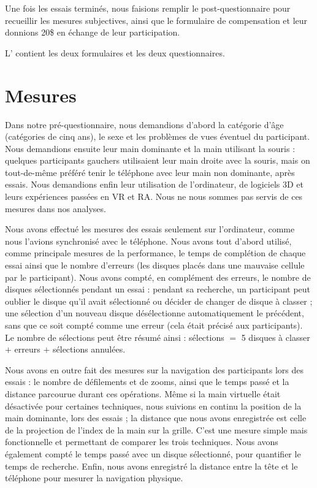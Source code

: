 Une fois les essais terminés, nous faisions remplir le post-questionnaire pour recueillir les mesures subjectives, ainsi que le formulaire de compensation et leur donnions 20\$ en échange de leur participation.

L' contient les deux formulaires et les deux questionnaires.


\section{Mesures}
\label{sec:experiment_measures}

Dans notre pré-questionnaire, nous demandions d'abord la catégorie d'âge (catégories de cinq ans), le sexe et les problèmes de vues éventuel du participant. Nous demandions ensuite leur main dominante et la main utilisant la souris : quelques participants gauchers utilisaient leur main droite avec la souris, mais on tout-de-même préféré tenir le téléphone avec leur main non dominante, après essais. Nous demandions enfin leur utilisation de l'ordinateur, de logiciels 3D et leurs expériences passées en VR et RA. Nous ne nous sommes pas servis de ces mesures dans nos analyses.

Nous avons effectué les mesures des essais seulement sur l'ordinateur, comme nous l'avions synchronisé avec le téléphone. Nous avons tout d'abord utilisé, comme principale mesures de la performance, le temps de complétion de chaque essai ainsi que le nombre d'erreurs (les disques placés dans une mauvaise cellule par le participant). Nous avons compté, en complément des erreurs, le nombre de disques sélectionnés pendant un essai : pendant sa recherche, un participant peut oublier le disque qu'il avait sélectionné ou décider de changer de disque à classer ; une sélection d'un nouveau disque désélectionne automatiquement le précédent, sans que ce soit compté comme une erreur (cela était précisé aux participants). Le nombre de sélections peut être résumé ainsi : sélections $=$ 5 disques à classer $+$ erreurs $+$ sélections annulées.

Nous avons en outre fait des mesures sur la navigation des participants lors des essais : le nombre de défilements et de zooms, ainsi que le temps passé et la distance parcourue durant ces opérations. Même si la main virtuelle était désactivée pour certaines techniques, nous suivions en continu la position de la main dominante, lors des essais ; la distance que nous avons enregistrée est celle de la projection de l'index de la main sur la grille. C'est une mesure simple mais fonctionnelle et permettant de comparer les trois techniques. Nous avons également compté le temps passé avec un disque sélectionné, pour quantifier le temps de recherche. Enfin, nous avons enregistré la distance entre la tête et le téléphone pour mesurer la navigation physique.

